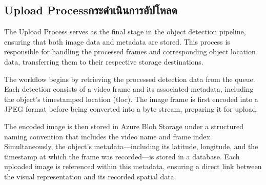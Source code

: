 \subsection{\ifenglish Upload Process\else กระดำเนินการอัปโหลด\fi}
The Upload Process serves as the final stage in the object detection pipeline, ensuring that both image data and metadata are stored. This process is responsible for handling the processed frames and corresponding object location data, transferring them to their respective storage destinations.

The workflow begins by retrieving the processed detection data from the queue. Each detection consists of a video frame and its associated metadata, including the object's timestamped location (tloc). The image frame is first encoded into a JPEG format before being converted into a byte stream, preparing it for upload.

The encoded image is then stored in Azure Blob Storage under a structured naming convention that includes the video name and frame index. Simultaneously, the object's metadata—including its latitude, longitude, and the timestamp at which the frame was recorded—is stored in a database. Each uploaded image is referenced within this metadata, ensuring a direct link between the visual representation and its recorded spatial data.